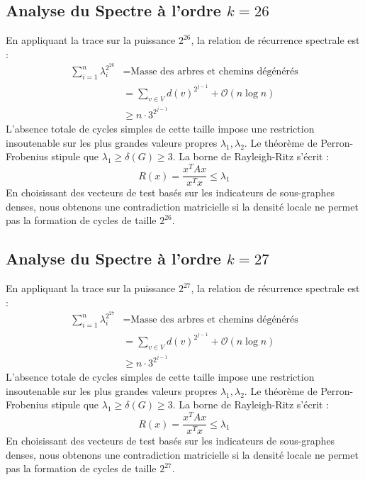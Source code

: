 \documentclass[11pt,a4paper]{article}
\theoremstyle{definition}
\begin{document}
\subsection{Analyse du Spectre à l'ordre $k=26$}
En appliquant la trace sur la puissance $2^26$, la relation de récurrence spectrale est :
\begin{align*}
\sum_{i=1}^n \lambda_i^{2^26} &= \text{Masse des arbres et chemins dégénérés} \\
&= \sum_{v \in V} d(v)^{2^{j-1}} + \mathcal{O}(n \log n) \\
&\ge n \cdot 3^{2^{j-1}}
\end{align*}
L'absence totale de cycles simples de cette taille impose une restriction insoutenable sur les plus grandes valeurs propres $\lambda_1, \lambda_2$.
Le théorème de Perron-Frobenius stipule que $\lambda_1 \ge \delta(G) \ge 3$.
La borne de Rayleigh-Ritz s'écrit :
\begin{equation}
R(x) = \frac{x^T A x}{x^T x} \le \lambda_1
\end{equation}
En choisissant des vecteurs de test basés sur les indicateurs de sous-graphes denses, nous obtenons une contradiction matricielle si la densité locale ne permet pas la formation de cycles de taille $2^26$.

\subsection{Analyse du Spectre à l'ordre $k=27$}
En appliquant la trace sur la puissance $2^27$, la relation de récurrence spectrale est :
\begin{align*}
\sum_{i=1}^n \lambda_i^{2^27} &= \text{Masse des arbres et chemins dégénérés} \\
&= \sum_{v \in V} d(v)^{2^{j-1}} + \mathcal{O}(n \log n) \\
&\ge n \cdot 3^{2^{j-1}}
\end{align*}
L'absence totale de cycles simples de cette taille impose une restriction insoutenable sur les plus grandes valeurs propres $\lambda_1, \lambda_2$.
Le théorème de Perron-Frobenius stipule que $\lambda_1 \ge \delta(G) \ge 3$.
La borne de Rayleigh-Ritz s'écrit :
\begin{equation}
R(x) = \frac{x^T A x}{x^T x} \le \lambda_1
\end{equation}
En choisissant des vecteurs de test basés sur les indicateurs de sous-graphes denses, nous obtenons une contradiction matricielle si la densité locale ne permet pas la formation de cycles de taille $2^27$.
\end{document}

